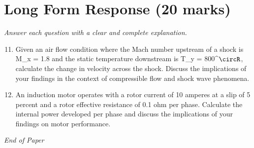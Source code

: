 \documentclass[12pt]{article}
\begin{document}
\section*{Long Form Response (20 marks)}
\textit{Answer each question with a clear and complete explanation.}
\begin{enumerate}[label=\arabic*.]
\setcounter{enumi}{10}
\item Given an air flow condition where the Mach number upstream of a shock is M\_x = 1.8 and the static temperature downstream is T\_y = 800^\ensuremath{\circR}, calculate the change in velocity across the shock. Discuss the implications of your findings in the context of compressible flow and shock wave phenomena.
\item An induction motor operates with a rotor current of 10 amperes at a slip of 5 percent and a rotor effective resistance of 0.1 ohm per phase. Calculate the internal power developed per phase and discuss the implications of your findings on motor performance.
\end{enumerate}

\vfill
\noindent\textit{End of Paper}
\end{document}
